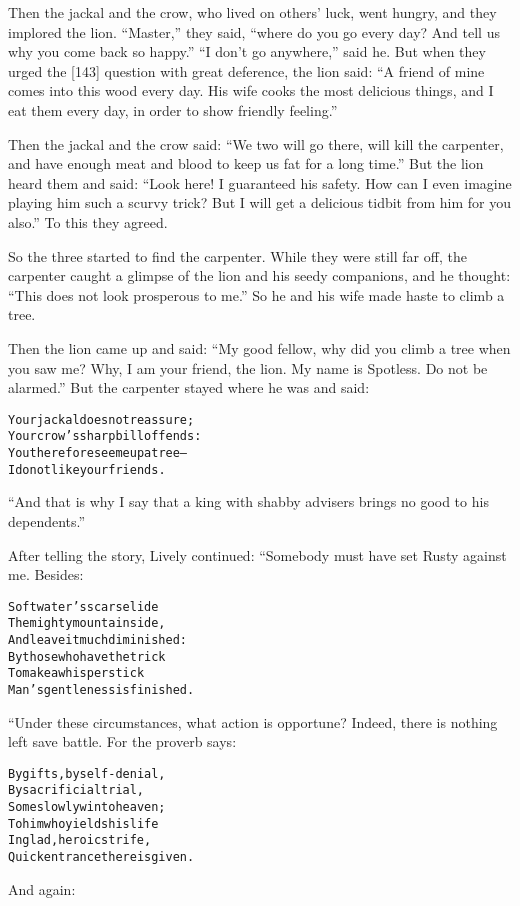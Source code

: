 \documentclass{article}
\renewenvironment{verbatim}{\begin{alltt}\normalfont\begin{centering}}{\end{centering}\end{alltt}}
\begin{document}
Then the jackal and the crow, who lived on others' luck, went
hungry, and they implored the lion. ``Master,'' they said,
``where do you go every day? And tell us why you come back so happy.''
``I don't go anywhere,'' said he. But when they urged the [143]
question with great deference, the lion said:
``A friend of mine comes into this wood every day. His wife cooks the most delicious things, and I eat them every day, in order to show friendly feeling.''

Then the jackal and the crow said:
``We two will go there, will kill the carpenter, and have enough meat and blood to keep us fat for a long time.''
But the lion heard them and said:
``Look here! I guaranteed his safety. How can I even imagine playing him such a scurvy trick? But I will get a delicious tidbit from him for you also.''
To this they agreed.

So the three started to find the carpenter. While they were still
far off, the carpenter caught a glimpse of the lion and his seedy
companions, and he thought:
``This does not look prosperous to me.'' So he and his wife made
haste to climb a tree.

Then the lion came up and said:
``My good fellow, why did you climb a tree when you saw me? Why, I am your friend, the lion. My name is Spotless. Do not be alarmed.''
But the carpenter stayed where he was and said:

\begin{verbatim}
Your jackal does not reassure;
    Your crow's sharp bill offends:
You therefore see me up a tree--
    I do not like your friends.                         
\end{verbatim}
``And that is why I say that a king with shabby advisers brings no good to his dependents.''

After telling the story, Lively continued: “Somebody must have set
Rusty against me. Besides:

\begin{verbatim}
Soft water's scars elide
The mighty mountain side,
    And leave it much diminished:
By those who have the trick
To make a whisper stick
    Man's gentleness is finished.
\end{verbatim}
“Under these circumstances, what action is opportune? Indeed, there
is nothing left save battle. For the proverb says:

\begin{verbatim}
By gifts, by self-denial,
By sacrificial trial,
    Some slowly win to heaven;
To him who yields his life
In glad, heroic strife,
    Quick entrance there is given.
\end{verbatim}
And again:
\end{document}

